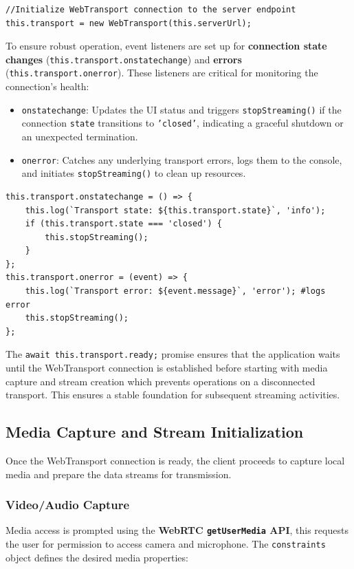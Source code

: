 \begin{lstlisting}[breaklines=true,basicstyle=\small\ttfamily,frame=single]
//Initialize WebTransport connection to the server endpoint
this.transport = new WebTransport(this.serverUrl);
\end{lstlisting}

To ensure robust operation, event listeners are set up for \textbf{connection state changes} (\texttt{this.transport.onstatechange}) and \textbf{errors} (\texttt{this.transport.onerror}). These listeners are critical for monitoring the connection's health:

\begin{itemize}
    \item \texttt{onstatechange}: Updates the UI status and triggers \texttt{stopStreaming()} if the connection \texttt{state} transitions to \texttt{'closed'}, indicating a graceful shutdown or an unexpected termination.
    \item \texttt{onerror}: Catches any underlying transport errors, logs them to the console, and initiates \texttt{stopStreaming()} to clean up resources.
\end{itemize}

\begin{lstlisting}[breaklines=true,basicstyle=\small\ttfamily,frame=single]
this.transport.onstatechange = () => {
    this.log(`Transport state: ${this.transport.state}`, 'info');
    if (this.transport.state === 'closed') {
        this.stopStreaming();
    }
};
this.transport.onerror = (event) => {
    this.log(`Transport error: ${event.message}`, 'error'); #logs error
    this.stopStreaming();
};
\end{lstlisting}

The \texttt{await this.transport.ready;} promise ensures that the application waits until the WebTransport connection is established before starting with media capture and stream creation which prevents operations on a disconnected transport. This ensures a stable foundation for subsequent streaming activities.

\subsection{Media Capture and Stream Initialization}
Once the WebTransport connection is ready, the client proceeds to capture local media and prepare the data streams for transmission.

\subsubsection{Video/Audio Capture}
Media access is prompted using the \textbf{WebRTC \texttt{getUserMedia} API}, this requests the user for permission to access camera and microphone. The \texttt{constraints} object defines the desired media properties:

